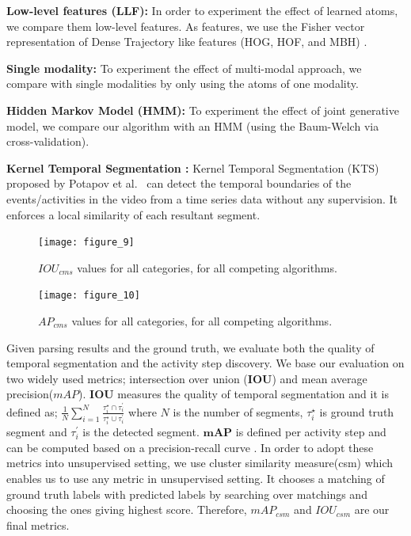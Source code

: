 \noindent\textbf{Low-level features (LLF):}
In order to experiment the effect of learned atoms, we compare them low-level features. As features, we use the Fisher vector representation of Dense Trajectory like features (HOG, HOF, and MBH) \cite{kantorov2014}.

\noindent\textbf{Single modality:}
To experiment the effect of multi-modal approach, we compare with single modalities by only using the atoms of one modality.

\noindent\textbf{Hidden Markov Model (HMM):}
To experiment the effect of joint generative model, we compare our algorithm with an HMM (using the Baum-Welch \cite{rabiner} via cross-validation).


\noindent\textbf{Kernel Temporal Segmentation \cite{potapov2014category}:}
Kernel Temporal Segmentation (KTS) proposed by Potapov et al.~\cite{potapov2014category} can detect the temporal boundaries of the events/activities in the video from a time series data without any supervision. It enforces a local similarity of each resultant segment.

\begin{figure}[t]
  \texttt{[image: figure\_9]}
  \vspace{-9mm}
  \caption{$IOU_{cms}$ values for all categories, for all competing algorithms.}
  \label{mIOU}
\texttt{[image: figure\_10]}
\vspace{-9mm}
\caption{$AP_{cms}$ values for all categories, for all competing algorithms.}
\vspace{-3mm}
\label{mmAP}
\end{figure}

Given parsing results and the ground truth, we evaluate both the quality of temporal segmentation and the activity step discovery. We base our evaluation on two widely used metrics; intersection over union ($\mathbf{IOU}$) and mean average precision($mAP$). $\mathbf{IOU}$ measures the quality of temporal segmentation and it is defined as; $\frac{1}{N}\sum_{i=1}^N \frac{\tau^\star_i \cap \tau^\prime_{i}}{\tau^\star_i \cup \tau^\prime_{i}}$ where $N$ is the number of segments, $\tau^\star_i$ is ground truth  segment and $\tau^\prime_{i}$ is the detected segment. $\mathbf{mAP}$ is defined per activity step and can be computed based on a precision-recall curve \cite{THUMOS14}. In order to adopt these metrics into unsupervised setting, we use cluster similarity measure(csm)\cite{liao05} which enables us to use any metric in unsupervised setting. It chooses a matching of ground truth labels with predicted labels by searching over matchings and choosing the ones giving highest score. Therefore, $mAP_{csm}$ and $IOU_{csm}$ are our final metrics.

